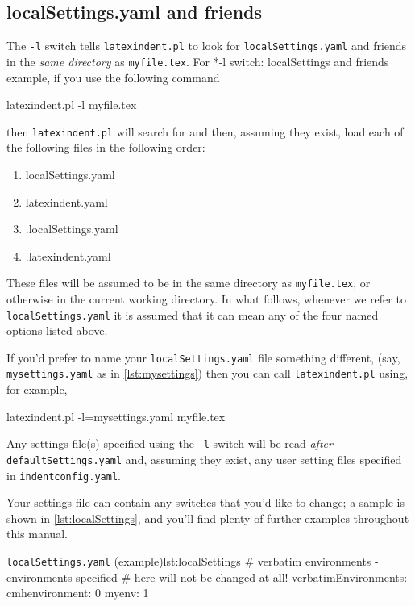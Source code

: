 \subsection{localSettings.yaml and friends}\label{sec:localsettings}
	The \texttt{-l} switch tells \texttt{latexindent.pl} to look for
	\texttt{localSettings.yaml} and friends in the \emph{same directory} as
	\texttt{myfile.tex}.  For%
	*{-l switch: localSettings and friends} example, if you use the following
	command
	\begin{commandshell}
latexindent.pl -l myfile.tex
\end{commandshell}
	then \texttt{latexindent.pl} will search for and then, assuming they exist, load each of
	the following files in the following order:
	\begin{enumerate}
		\item localSettings.yaml
		\item latexindent.yaml
		\item .localSettings.yaml
		\item .latexindent.yaml
	\end{enumerate}
	These files will be assumed to be in the same directory as \texttt{myfile.tex}, or
	otherwise in the current working directory. In what follows, whenever we refer to
	\texttt{localSettings.yaml} it is assumed that it can mean any of the four named options
	listed above.

	If you'd prefer to name your \texttt{localSettings.yaml} file something different, (say,
	\texttt{mysettings.yaml} as in \cref{lst:mysettings}) then you can call
	\texttt{latexindent.pl} using, for example,
	\begin{commandshell}
latexindent.pl -l=mysettings.yaml myfile.tex
\end{commandshell}

	Any settings file(s) specified using the \texttt{-l} switch will be read
	\emph{after} \texttt{defaultSettings.yaml} and, assuming they exist, any user setting
	files specified in \texttt{indentconfig.yaml}.

	Your settings file can contain any switches that you'd like to change; a sample is shown
	in \cref{lst:localSettings}, and you'll find plenty of further examples throughout this
	manual.

	\begin{yaml}{\texttt{localSettings.yaml} (example)}{lst:localSettings}
#  verbatim environments - environments specified
#  here will not be changed at all!
verbatimEnvironments:
    cmhenvironment: 0
    myenv: 1
\end{yaml}

